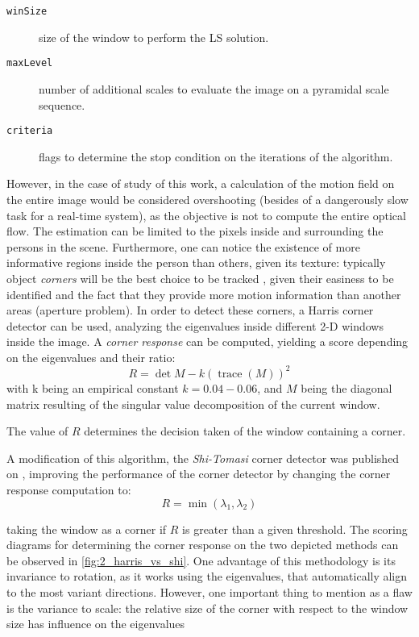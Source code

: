 \begin{description}
	\item[\texttt{winSize}] size of the window to perform the LS solution.
	\item[\texttt{maxLevel}] number of additional scales to evaluate the image on a pyramidal scale sequence.
	\item[\texttt{criteria}] flags to determine the stop condition on the iterations of the algorithm.
\end{description}

However, in the case of study of this work, a calculation of the motion field on the entire image would be considered overshooting (besides of a dangerously slow task for a real-time system), as the objective is not to compute the entire optical flow. The estimation can be limited to the pixels inside and surrounding the persons in the scene. Furthermore, one can notice the existence of more informative regions inside the person than others, given its texture: typically object \textit{corners} will be the best choice to be tracked \cite{diapos_cv_features}, given their easiness to be identified and the fact that they provide more motion information than another areas (aperture problem). In order to detect these corners, a Harris corner detector can be used, analyzing the eigenvalues inside different 2-D windows inside the image. A \textit{corner response} can be computed, yielding a score depending on the eigenvalues and their ratio:
$$
R = \det M - k(\operatorname{trace}(M))^2
$$
with k being an empirical constant $k=0.04-0.06$, and $M$ being the diagonal matrix resulting of the singular value decomposition of the current window.

The value of $R$ determines the decision taken of the window containing a corner.

A modification of this algorithm, the \textit{Shi-Tomasi} corner detector was published on \cite{shi_tomasi}, improving the performance of the corner detector by changing the corner response computation to:
$$
R = \min(\lambda_1, \lambda_2)
$$

taking the window as a corner if $R$ is greater than a given threshold. The scoring diagrams for determining the corner response on the two depicted methods can be observed in \autoref{fig:2_harris_vs_shi}. One advantage of this methodology is its invariance to rotation, as it works using the eigenvalues, that automatically align to the most variant directions. However, one important thing to mention as a flaw is the variance to scale: the relative size of the corner with respect to the window size has influence on the eigenvalues 

